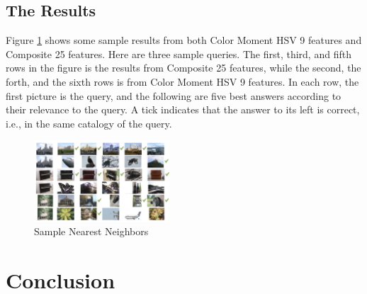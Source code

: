 \documentclass{acm_proc_article-sp}
\begin{document}
\subsection{The Results}
Figure \ref{fig:result} shows some sample results from both
    Color Moment HSV 9 features and
    Composite 25 features.
Here are three sample queries.
The first, third, and fifth rows in the figure
    is the results from Composite 25 features,
    while the second, the forth, and the sixth
    rows is from Color Moment HSV 9 features.
In each row, the first picture is the query,
    and the following are five best answers according to
    their relevance to the query.
A tick indicates that the answer to its left is correct,
    i.e., in the same catalogy of the query.
\begin{figure} \centering
    \includegraphics[width=0.45\textwidth]{data/result.png}
    \caption{Sample Nearest Neighbors}
    \label{fig:result}
\end{figure}

\section{Conclusion}



 

\balancecolumns
\end{document}
